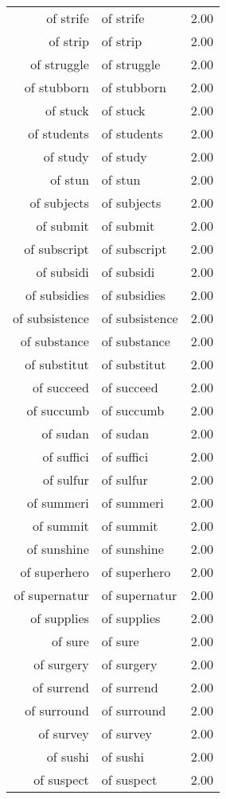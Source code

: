\begin{table}[ht]
\begin{tabular}{rlr}
  of strife & of strife & 2.00 \\ 
  of strip & of strip & 2.00 \\ 
  of struggle & of struggle & 2.00 \\ 
  of stubborn & of stubborn & 2.00 \\ 
  of stuck & of stuck & 2.00 \\ 
  of students & of students & 2.00 \\ 
  of study & of study & 2.00 \\ 
  of stun & of stun & 2.00 \\ 
  of subjects & of subjects & 2.00 \\ 
  of submit & of submit & 2.00 \\ 
  of subscript & of subscript & 2.00 \\ 
  of subsidi & of subsidi & 2.00 \\ 
  of subsidies & of subsidies & 2.00 \\ 
  of subsistence & of subsistence & 2.00 \\ 
  of substance & of substance & 2.00 \\ 
  of substitut & of substitut & 2.00 \\ 
  of succeed & of succeed & 2.00 \\ 
  of succumb & of succumb & 2.00 \\ 
  of sudan & of sudan & 2.00 \\ 
  of suffici & of suffici & 2.00 \\ 
  of sulfur & of sulfur & 2.00 \\ 
  of summeri & of summeri & 2.00 \\ 
  of summit & of summit & 2.00 \\ 
  of sunshine & of sunshine & 2.00 \\ 
  of superhero & of superhero & 2.00 \\ 
  of supernatur & of supernatur & 2.00 \\ 
  of supplies & of supplies & 2.00 \\ 
  of sure & of sure & 2.00 \\ 
  of surgery & of surgery & 2.00 \\ 
  of surrend & of surrend & 2.00 \\ 
  of surround & of surround & 2.00 \\ 
  of survey & of survey & 2.00 \\ 
  of sushi & of sushi & 2.00 \\ 
  of suspect & of suspect & 2.00 \\ 

\end{tabular}
\end{table}
